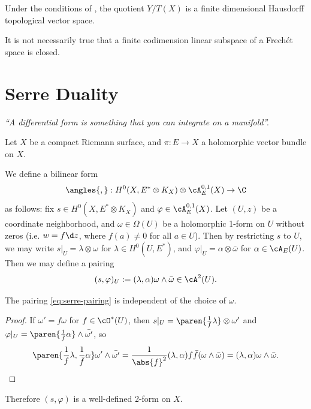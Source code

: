 \documentclass[11pt]{report}
\begin{document}
\begin{cor}
Under the conditions of , the quotient $Y/T(X)$ is a finite dimensional Hausdorff topological vector space.
\end{cor}

\begin{rmk}
It is not necessarily true that a finite codimension linear subspace of a Frech\'{e}t space is closed.
\end{rmk}



\section{Serre Duality}

\textit{``A differential form is something that you can integrate on a manifold''.}

Let $X$ be a compact Riemann surface, and $\pi:E \to X$ a holomorphic vector bundle on $X$.

We define a bilinear form 
\[
\angles{,}:H^0(X,E^*\otimes K_X)\otimes \cA_E^{0,1}(X) \to \C
\]
as follows: fix $s \in H^0(X,E^*\otimes K_X)$ and $\varphi \in \cA_E^{0,1}(X)$. Let $(U,z)$ be a coordinate neighborhood, and $\omega \in \Omega(U)$ be a holomorphic 1-form on $U$ without zeros (i.e. $w = f\d z$, where $f(a) \neq 0$ for all $a \in U$). Then by restricting $s$ to $U$, we may write $s|_U = \lambda \otimes \omega$ for $\lambda \in H^0(U,E^*)$, and $\varphi|_U = \alpha \otimes \bar \omega$ for $\alpha \in \cA_E(U)$. Then we may define a pairing
\begin{align} \label{eq:serre-pairing}
    (s,\varphi)_U:= (\lambda,\alpha)\omega \land \bar \omega
\in \cA^2(U).
\end{align}
\begin{claim}
The pairing \eqref{eq:serre-pairing} is independent of the choice of $\omega$.
\end{claim}

\begin{proof}
If $\omega' = f\omega$ for $f \in \cO^*(U)$, then $s|_U = \paren{\frac{1}{f}\lambda}\otimes \omega '$ and $\varphi|_U = \paren{\frac{1}{\bar f}\alpha} \land \bar{\omega '}$, so
\[
\paren{\frac{1}{f}\lambda, \frac{1}{\bar f}\alpha} \omega' \land \bar{\omega '} = \frac{1}{\abs{f}^2}(\lambda, \alpha) f \bar f (\omega \land \bar{\omega}) = (\lambda,\alpha) \omega \land \bar{\omega}.
\]
\end{proof}
Therefore $(s,\varphi)$ is a well-defined 2-form on $X$.
\end{document}
